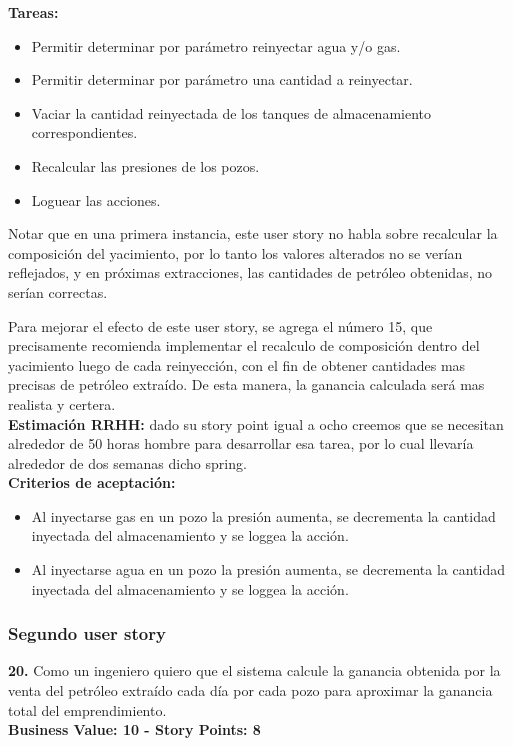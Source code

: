 \textbf{Tareas:}

\begin{itemize}
    \item Permitir determinar por parámetro reinyectar agua y/o gas.
    \item Permitir determinar por parámetro una cantidad a reinyectar.
    \item Vaciar la cantidad reinyectada de los tanques de almacenamiento correspondientes.
    \item Recalcular las presiones de los pozos.
    \item Loguear las acciones.
\end{itemize}

Notar que en una primera instancia, este user story no habla sobre recalcular la composición del yacimiento, por lo tanto los valores alterados no se verían reflejados, y en próximas extracciones, las cantidades de petróleo obtenidas, no serían correctas.

Para mejorar el efecto de este user story, se agrega el número 15, que precisamente recomienda implementar el recalculo de composición dentro del yacimiento luego de cada reinyección, con el fin de obtener cantidades mas precisas de petróleo extraído. De esta manera, la ganancia calculada será mas realista y certera.\\

\textbf{Estimaci\'on RRHH:}
dado su story point igual a ocho creemos que se necesitan alrededor de 50 horas hombre para desarrollar esa tarea, por lo cual llevar\'ia alrededor de dos semanas dicho spring.\\

\textbf{Criterios de aceptaci\'on:}
\begin{itemize}
    \item Al inyectarse gas en un pozo la presi\'on aumenta, se decrementa la cantidad inyectada del almacenamiento y se loggea la acci\'on.
    \item Al inyectarse agua en un pozo la presi\'on aumenta, se decrementa la cantidad inyectada del almacenamiento y se loggea la acci\'on.
\end{itemize}

\subsubsection{Segundo user story}

\textbf{20.} Como un ingeniero quiero que el sistema calcule la ganancia obtenida por la venta del petróleo extraído cada día por cada pozo para aproximar la ganancia total del emprendimiento.\\
\textbf{Business Value: 10 - Story Points: 8}\\

